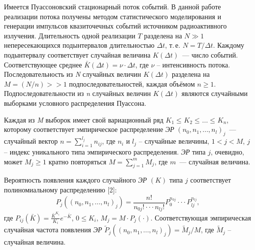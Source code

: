 







\vzmscaption

Имеется Пуассоновский стационарный поток событий.
В данной работе реализации потока получены методом статистического моделирования и генерации импульсов квазиточечных событий
источником радиоактивного излучения.
Длительность одной реализации $T$ разделена на $N \gg 1$ непересекающихся подынтервалов длительностью $\Delta t$,
т.\,е. $N=T/\Delta t$. Каждому подынтервалу соответствует случайная величина $K(\Delta t)$~--- число событий.
Соответствующее среднее $\bar{K}(\Delta t)=\nu \cdot \Delta t$, где $\nu $ -- интенсивность потока. Последовательность из \textit{N} случайных величин $K(\Delta t)$ разделена на $M=(N/n)>>1$  подпоследовательностей, каждая объёмом $n\geqslant 1$. Подпоследовательности из \textit{n}  случайных величин $K(\Delta t)$ являются случайными выборками условного распределения Пуассона.


Каждая из \textit{M} выборок имеет свой вариационный ряд $K_{1}  \leqslant _{} K_{2}  \leqslant _{}  ...  \leqslant _{} K{}_{n} $,
которому соответствует эмпирическое распределение {\it ЭР} $ ( n_{0} ,    n_{1} ,  ...  ,   n_{l}  )_{j} $~---
случайный вектор $n=\sum _{i=1}^{l_{j} }n_{ij}  $, где $n_{i} $ и $l_{j} $ --  случайные величины,
$1<j<M$, $j$ -- индекс уникального типа эмпирического распределения.
{\it ЭР}  типа  $j$, очевидно, может $M_{j} \geqslant 1$ кратно повторяться $M=\sum _{j=1}^{m}M_{j}  $, где $m$~--- случайная величина.


Вероятность появления каждого случайного {\it ЭР} $ (K)$ типа $j$ соответствует полиномиальному распределению [2]:
\[P_{j} (( n_{0} ,  n_{1} ,  ...  ,  n_{l}  )_{j} )=\frac{n!}{n_{0j} !\cdot \cdot \cdot n_{lj} !} P_{0}^{n_{0j} } \cdot \cdot \cdot P_{lj}^{n_{lj} } ,\]
где $P_{ij} (\bar{K})=\frac{\bar{K}^{K_{i} } }{K_{i} } e^{-\bar{K}} $, $0\leqslant K_{i} $, $M_{j} =M\cdot P_{j} (\cdot)$. Соответствующая эмпирическая случайная частота появления {\it ЭР}    $\tilde{P}_{j} (( n_{0} ,  n_{1} ,  ...  ,  n_{l}  )_{j} )=\tilde{M}_{j} /M$, где $\tilde{M}_{j} $ --  случайная величина.


